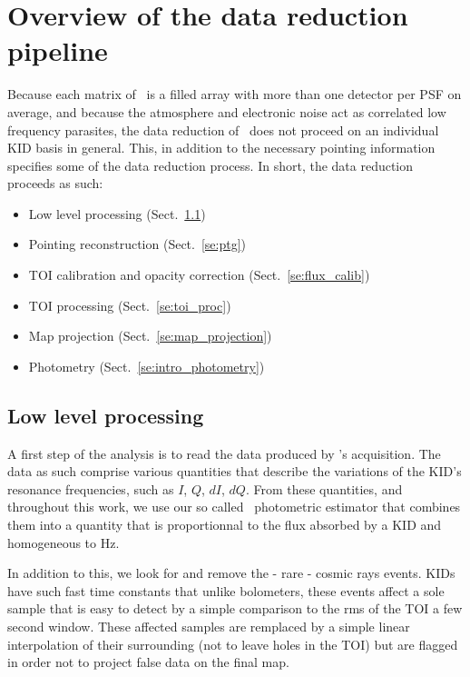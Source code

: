 

\section{Overview of the data reduction pipeline}%
\label{se:pipeline_overview}

Because each matrix of \nika\ is a filled array with more than one detector per
PSF on average, and because the atmosphere and electronic noise act as
correlated low frequency parasites, the data reduction of \nika\ does not
proceed on an individual KID basis in general. This, in addition to the
necessary pointing information specifies some of the data reduction
process. In short, the data reduction proceeds as such:

\begin{itemize}
\item Low level processing (Sect.~\ref{se:ll_proc})
\item Pointing reconstruction (Sect.~\ref{se:ptg})
\item TOI calibration and opacity correction (Sect.~\ref{se:flux_calib})
\item TOI processing (Sect.~\ref{se:toi_proc})
\item Map projection (Sect.~\ref{se:map_projection})
\item Photometry (Sect.~\ref{se:intro_photometry})
\end{itemize}

\subsection{Low level processing}
\label{se:ll_proc}

A first step of the analysis is to read the data produced by \nika's
acquisition. The data as such comprise various quantities that describe the
variations of the KID's resonance frequencies, such as $I$, $Q$, $dI$,
$dQ$. From these quantities, and throughout this work, we use our so called
\rf\ photometric estimator that combines them into a quantity that is
proportionnal to the flux absorbed by a KID \cite{Calvo13} and homogeneous to Hz.

In addition to this, we look for and remove the - rare - cosmic rays
events. KIDs have such fast time constants that unlike bolometers, these events
affect a sole sample that is easy to detect by a simple comparison to the rms of
the TOI a few second window. These affected samples are remplaced by a simple
linear interpolation of their surrounding (not to leave holes in the TOI) but
are flagged in order not to project false data on the final map.


